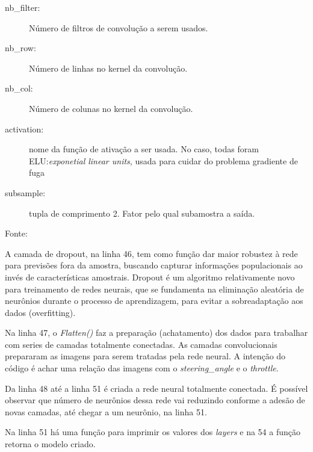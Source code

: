 \begin{description}
    \item[nb\_filter:] Número de filtros de convolução a serem usados.
    \item[nb\_row:] Número de linhas no kernel da convolução.
    \item[nb\_col:] Número de colunas no kernel da convolução.
    \item[activation:] nome da função de ativação a ser usada. No caso, todas foram ELU:\textit{exponetial linear units}, usada para cuidar do problema gradiente de fuga
    \item[subsample:] tupla de comprimento 2. Fator pelo qual subamostra a saída.
    \item[Fonte:] \cite{kerasconv}
\end{description}
A camada de dropout, na linha 46, tem como função dar maior robustez à rede para previsões fora da amostra, buscando capturar informações populacionais ao invés de características amostrais. 
Dropout é um algoritmo relativamente novo para treinamento de redes neurais, que se fundamenta na eliminação aleatória de neurônios durante o processo de aprendizagem, para evitar a sobreadaptação aos dados (overfitting).

Na linha 47, o \textit{Flatten()} faz a preparação (achatamento) dos dados para trabalhar com series de camadas totalmente conectadas. As camadas convolucionais prepararam as imagens para serem tratadas pela rede neural. A intenção do código é achar uma relação das imagens com o \textit{steering\_angle} e o \textit{throttle}.

Da linha 48 até a linha 51 é criada a rede neural totalmente conectada. É possível observar que número de neurônios dessa rede vai reduzindo conforme a adesão de novas camadas, até chegar a um neurônio, na linha 51. 

Na linha 51 há uma função para imprimir os valores dos \textit{layers} e na 54 a função retorna o modelo criado.

	\begin{figure}[H]
		\centering
\end{figure}

